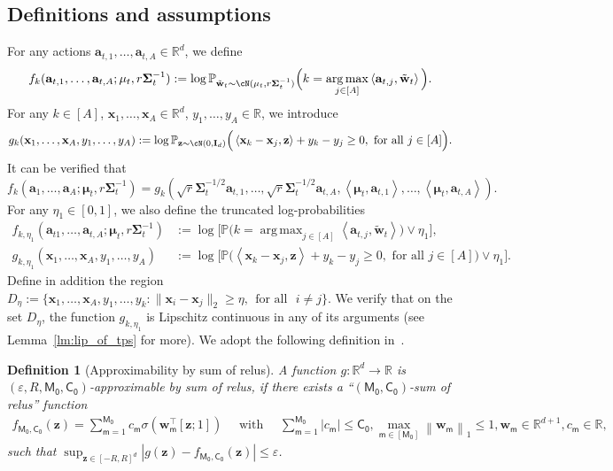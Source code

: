 \documentclass[10pt]{article}
\newtheorem{definition}[theorem]{Definition}
\newcommand{\id}{\bI}
\newcommand{\eps}{\varepsilon}
\DeclareMathOperator*{\argmax}{arg\,max}
\newcommand{\<}{\left\langle}
\renewcommand{\>}{\right\rangle}
\renewcommand{\P}{\mathbb{P}}
\newcommand{\R}{\mathbb{R}}
\newcommand{\Tpsmean}{{{\mathbf\mu}}}
\newcommand{\Tpscov}{{{\mathbf\Sigma}}}
\newcommand{\Tpssam}{{\tilde\bw}}
\newcommand{\Tpsparn}{{r}}
\newcommand{\trunprob}{{\eta_1}}
\newcommand{\Trunreg}{{D}}
\newcommand{\Trunregp}{{\eta}}
\newcommand{\ssm}{{\mathsf{m}}}
\newcommand{\neuron}{{\mathsf{M_0}}}
\newcommand{\weightn}{{{\mathsf{C_0}}}}
\def\bI{{\mathbf I}}
\def\ba{{\mathbf a}}
\def\bw{{\mathbf w}}
\def\bx{{\mathbf x}}
\def\bz{{\mathbf z}}
\begin{document}
\subsection{Definitions and assumptions}\label{app:thompson_def_ass}
For any actions $\ba_{t,1},\ldots,\ba_{t,A}\in\R^{d}$, we define
\begin{align*}
f_k(\ba_{t,1},\ldots,\ba_{t,A};\Tpsmean_t,\Tpsparn\Tpscov_t^{-1}):=\log\P_{\Tpssam_t\sim\cN(\Tpsmean_t,\Tpsparn\Tpscov_t^{-1})}\Big(k =\argmax_{j\in[A]}\<\ba_{t,j},\Tpssam_t\>\Big).
\end{align*}
For any $k\in[A]$, $\bx_1,\ldots,\bx_A\in\R^{d}$, $y_1,\ldots,y_A\in\R$, we introduce $$
g_k(\bx_1,\ldots,\bx_A,y_1,\ldots,y_A):=\log\P_{\bz\sim\cN(0,\id_d)} \Big(\<\bx_k-\bx_j,\bz\>+y_k-y_j\geq0,\text{~for all~}j\in[A] \Big).
$$
It can be verified that $$f_k(\ba_1,\ldots,\ba_A;\Tpsmean_t,\Tpsparn\Tpscov_t^{-1})=g_k(\sqrt{\Tpsparn}\Tpscov_t^{-1/2}\ba_{t,1},\ldots,\sqrt{\Tpsparn}\Tpscov_t^{-1/2}\ba_{t,A},\<\Tpsmean_t,\ba_{t,1}\>,\ldots,\<\Tpsmean_t,\ba_{t,A}\>).$$
For any $\trunprob\in[0,1]$, we also define the truncated log-probabilities
\begin{align*}
f_{k,\trunprob}(\ba_{t1},\ldots,\ba_{t,A};\Tpsmean_t,\Tpsparn\Tpscov_t^{-1})&:=\log\Big[\P \Big( k =\argmax_{j \in[A]}\<\ba_{t,j},\Tpssam_t\> \Big)\vee\trunprob \Big],\\
g_{k,\trunprob}(\bx_1,\ldots,\bx_A,y_1,\ldots,y_A)&:=\log \Big[ \P \Big(\<\bx_k-\bx_j,\bz\>+y_k-y_j\geq0,\text{~for all~}j\in[A] \Big) \vee \trunprob \Big].
\end{align*}
Define in addition the region $\Trunreg_{\Trunregp}:=\{\bx_1,\ldots,\bx_A,y_1,\ldots,y_k: \|\bx_i-\bx_j\|_2\geq\Trunregp,~~\text{for all~~} i\neq j\}$. We verify that on the set $\Trunreg_\Trunregp$, the function $g_{k,\trunprob}$ is Lipschitz continuous in any of its arguments (see Lemma~\ref{lm:lip_of_tps} for more).
We adopt the following definition in~\cite{bai2023transformers}.
\begin{definition}[Approximability by sum of relus]\label{def:general_mlp_approx_new}
     A function $g: \mathbb{R}^d \rightarrow \mathbb{R}$ is $(\eps, R, \neuron, \weightn)$-approximable by sum of relus, if there exists a ``$(\neuron, \weightn)$-sum of relus'' function
\begin{align*}
f_{\neuron, \weightn}(\mathbf{z})=\sum_{\ssm=1}^\neuron c_\ssm \sigma\left(\mathbf{w}_\ssm^{\top}[\mathbf{z} ; 1]\right) \quad \text { with } \quad \sum_{\ssm=1}^\neuron\left|c_\ssm\right| \leq \weightn, \max _{\ssm \in[\neuron]}\left\|\mathbf{w}_\ssm\right\|_1 \leq 1, \mathbf{w}_\ssm \in \mathbb{R}^{d+1},c_\ssm \in \mathbb{R},~
\end{align*}
such that $\sup _{\mathbf{z} \in[-R, R]^d}\left|g(\mathbf{z})-f_{\neuron,\weightn}(\mathbf{z})\right| \leq \eps$.
\end{definition}
\end{document}
